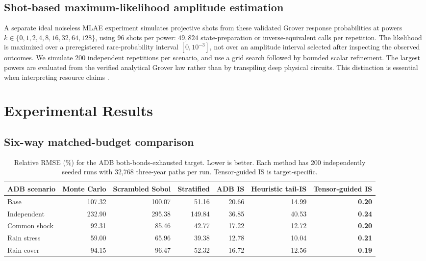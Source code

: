 \documentclass[10pt,conference]{IEEEtran}
\begin{document}
\subsection{Shot-based maximum-likelihood amplitude estimation}
A separate ideal noiseless MLAE experiment simulates projective shots from these validated Grover response probabilities at powers $k\in\{0,1,2,4,8,16,32,64,128\}$, using 96 shots per power: $49{,}824$ state-preparation or inverse-equivalent calls per repetition. The likelihood is maximized over a preregistered rare-probability interval $[0,10^{-3}]$, not over an amplitude interval selected after inspecting the observed outcomes. We simulate 200 independent repetitions per scenario, and use a grid search followed by bounded scalar refinement. The largest powers are evaluated from the verified analytical Grover law rather than by transpiling deep physical circuits. This distinction is essential when interpreting resource claims \cite{grinko,brassard}.

\section{Experimental Results}
\subsection{Six-way matched-budget comparison}
\begin{table}[t]
\centering
\caption{Relative RMSE (\%) for the ADB both-bonds-exhausted target. Lower is better. Each method has 200 independently seeded runs with 32,768 three-year paths per run. Tensor-guided IS is target-specific.}
\label{tab:rare}
\small
\setlength{\tabcolsep}{6pt}
\begin{tabular}{@{}lrrrrrr@{}}
\toprule
ADB scenario & Monte Carlo & Scrambled Sobol & Stratified & ADB IS & Heuristic tail-IS & \textbf{Tensor-guided IS} \\
\midrule
Base & 107.32 & 100.07 & 51.16 & 20.66 & 14.99 & \textbf{0.20} \\
Independent & 232.90 & 295.38 & 149.84 & 36.85 & 40.53 & \textbf{0.24} \\
Common shock & 92.31 & 85.46 & 42.77 & 17.22 & 12.72 & \textbf{0.20} \\
Rain stress & 59.00 & 65.96 & 39.38 & 12.78 & 10.04 & \textbf{0.21} \\
Rain cover & 94.15 & 96.47 & 52.32 & 16.72 & 12.56 & \textbf{0.19} \\
\bottomrule
\end{tabular}
\end{table}
\end{document}
